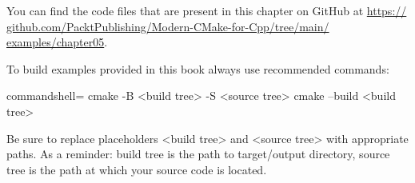 You can find the code files that are present in this chapter on GitHub at \url{https:// github.com/PacktPublishing/Modern-CMake-for-Cpp/tree/main/ examples/chapter05}.

To build examples provided in this book always use recommended commands:

\begin{tcblisting}{commandshell={}}
cmake -B <build tree> -S <source tree>
cmake --build <build tree>
\end{tcblisting}

Be sure to replace placeholders <build tree> and <source tree> with appropriate paths. As a reminder: build tree is the path to target/output directory, source tree is the path at which your source code is located.
